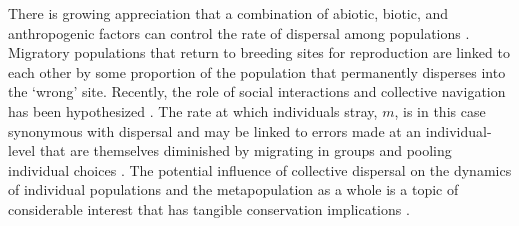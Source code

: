 \documentclass{revtex4}
\begin{document}
There is growing appreciation that a combination of abiotic, biotic, and anthropogenic factors can control the rate of dispersal among populations \citep{H:2013fs,Keefer:2014gg,Bett:2017ha}.
Migratory populations that return to breeding sites for reproduction are linked to each other by some proportion of the population that permanently disperses into the `wrong' site. 
Recently, the role of social interactions and collective navigation has been hypothesized \citep[][This issue]{Berdahl:2015kv,Berdahl:2016dx}.
The rate at which individuals stray, $m$, is in this case synonymous with dispersal and may be linked to errors made at an individual-level that are themselves diminished by migrating in groups and pooling individual choices \citep{Simons:2004jo,Berdahl:2015kv,Berdahl:2016dx}.
The potential influence of collective dispersal on the dynamics of individual populations and the metapopulation as a whole is a topic of considerable interest that has tangible conservation implications \citep{Brenner:2012gl,Johnson:2012fe,Fullerton:2011ii}.



\end{document}
